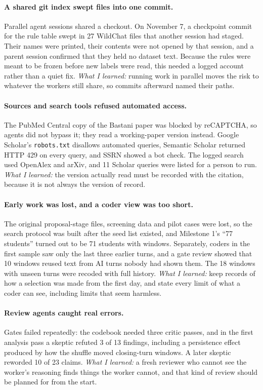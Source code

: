 \documentclass[manuscript,screen]{acmart}
\newcommand{\code}[1]{\texttt{#1}}
\begin{document}
\paragraph{A shared git index swept files into one commit.} Parallel agent sessions shared a checkout. On November 7, a checkpoint commit for the rule table swept in 27 WildChat files that another session had staged. Their names were printed, their contents were not opened by that session, and a parent session confirmed that they held no dataset text. Because the rules were meant to be frozen before new labels were read, this needed a logged account rather than a quiet fix. \emph{What I learned:} running work in parallel moves the risk to whatever the workers still share, so commits afterward named their paths.

\paragraph{Sources and search tools refused automated access.} The PubMed Central copy of the Bastani paper was blocked by reCAPTCHA, so agents did not bypass it; they read a working-paper version instead. Google Scholar's \code{robots.txt} disallows automated queries, Semantic Scholar returned HTTP 429 on every query, and SSRN showed a bot check. The logged search used OpenAlex and arXiv, and 11 Scholar queries were listed for a person to run. \emph{What I learned:} the version actually read must be recorded with the citation, because it is not always the version of record.

\paragraph{Early work was lost, and a coder view was too short.} The original proposal-stage files, screening data and pilot cases were lost, so the search protocol was built after the seed list existed, and Milestone 1's ``77 students'' turned out to be 71 students with windows. Separately, coders in the first sample saw only the last three earlier turns, and a gate review showed that 10 windows reused text from AI turns nobody had shown them. The 18 windows with unseen turns were recoded with full history. \emph{What I learned:} keep records of how a selection was made from the first day, and state every limit of what a coder can see, including limits that seem harmless.

\paragraph{Review agents caught real errors.} Gates failed repeatedly: the codebook needed three critic passes, and in the first analysis pass a skeptic refuted 3 of 13 findings, including a persistence effect produced by how the shuffle moved closing-turn windows. A later skeptic reworded 10 of 23 claims. \emph{What I learned:} a fresh reviewer who cannot see the worker's reasoning finds things the worker cannot, and that kind of review should be planned for from the start.
\end{document}
